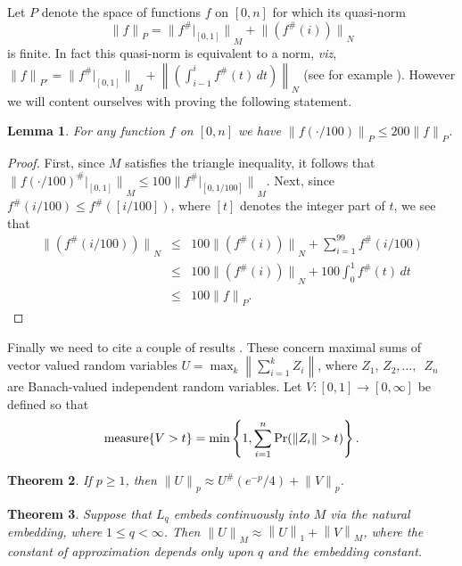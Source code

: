 \documentclass[12pt]{amsart}
\newtheorem{thm}{Theorem}
\newtheorem{lemma}[thm]{Lemma}
\newcommand{\normo}[1]{{\left\|#1\right\|}}
\newcommand{\snormo}[1]{{\mathopen\|#1\mathclose\|}}
\newcommand{\measure}{\text{\rm measure}}
\begin{document}
Let $P$ denote the space of functions $f$ on $[0,n]$ for which its quasi-norm
\[
   \snormo f_P = \snormo{f^\#|_{[0,1]}}_M + \snormo{(f^\#(i))}_N
\]
is finite.  In fact this quasi-norm is equivalent to a norm, \emph{viz},
$\snormo f_{P'} = \snormo{f^\#|_{[0,1]}}_M 
    + \normo{\left(\int_{i-1}^i f^\#(t) \, dt\right)}_N$ (see for example
\cite[Section~7]{montgomery-smith-semenov}).  However we will content ourselves
with proving the following statement.

\begin{lemma}
\label{l dilate P} For any function $f$ on $[0,n]$ we have
$\snormo{f(\cdot/100)}_P \le 200 \snormo f_P$.
\end{lemma}

\begin{proof}
First, since $M$ satisfies the triangle inequality, it follows
that 
$\snormo{f(\cdot/100)^\#|_{[0,1]}}_M \le 100\snormo{f^\#|_{[0,1/100]}}_M$.  
Next, since $f^\#(i/100) \le f^\#([i/100])$, where $[t]$ denotes the integer
part of $t$, we see that
\begin{eqnarray*}
   \snormo{(f^\#(i/100))}_N 
   &\le& 100 \snormo{(f^\#(i))}_N + \sum_{i=1}^{99} f^\#(i/100) \\
   &\le& 100 \snormo{(f^\#(i))}_N + 100 \int_0^1 f^\#(t) \, dt \\
   &\le& 100 \snormo f_P .
\end{eqnarray*}
\end{proof}

Finally we need to cite a couple of results 
\cite[Theorem 6.1 and Theorem 7.1]{hitczenko-montgomery-smith}.
These concern maximal sums of vector valued random variables
$U = \max_k \normo{\sum_{i=1}^k Z_i}$, where $Z_1$, $Z_2,\dots,$\
$Z_n$ are Banach-valued independent random variables.
Let $V:[0,1]\to[0,\infty]$ be defined so that
\[
   \measure\{V>t\} = \min\left\{ 1 ,
   \sum_{i=1}^n \Pr(\snormo{Z_i} > t) \right\} .
\]

\begin{thm}
\label{t lp}
If
$p \ge 1$, 
then
$ \snormo U_p \approx U^\#(e^{-p}/4) + \snormo V_p $.
\end{thm}

\begin{thm}
\label{t r.i.}
Suppose that $L_q$ embeds continuously into $M$ via the natural embedding,
where $1 \le q < \infty$.  Then
$ \snormo U_M  \approx \normo U_1 + \normo V_M $,
where the constant of approximation depends only upon $q$ and the embedding
constant.
\end{thm}
\end{document}

